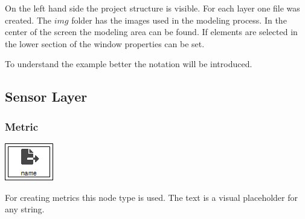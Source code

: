 On the left hand side the project structure is visible. For each layer one file was created. The $img$ folder has the images used in the modeling process. In the center of the screen the modeling area can be found. If elements are selected in the lower section of the window properties can be set.

To understand the example better the notation will be introduced.

\subsection{Sensor Layer}

\subsubsection{Metric}
\noindent\begin{minipage}{0.15\textwidth}%
	\includegraphics[width=\linewidth]{assets/images/metric}
\end{minipage}%
\hfill%
\begin{minipage}{0.8\textwidth}
	For creating metrics this node type is used. The text  is a visual placeholder for any string.
\end{minipage}



